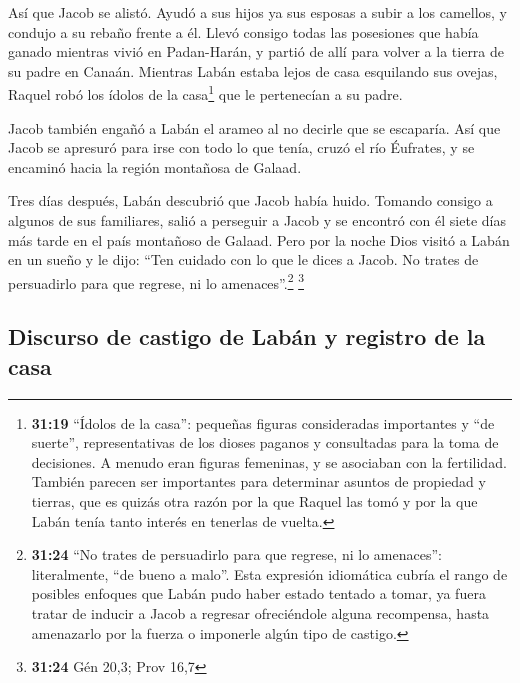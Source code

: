  Así que Jacob se alistó. Ayudó a sus hijos ya sus
esposas a subir a los camellos,  y condujo a su rebaño
frente a él. Llevó consigo todas las posesiones que había ganado
mientras vivió en Padan-Harán, y partió de allí para volver a la tierra
de su padre en Canaán.  Mientras Labán estaba lejos de
casa esquilando sus ovejas, Raquel robó los ídolos de la casa\footnote{\textbf{31:19}
  ``Ídolos de la casa'': pequeñas figuras consideradas importantes y
  ``de suerte'', representativas de los dioses paganos y consultadas
  para la toma de decisiones. A menudo eran figuras femeninas, y se
  asociaban con la fertilidad. También parecen ser importantes para
  determinar asuntos de propiedad y tierras, que es quizás otra razón
  por la que Raquel las tomó y por la que Labán tenía tanto interés en
  tenerlas de vuelta.} que le pertenecían a su padre.

 Jacob también engañó a Labán el arameo al no decirle que
se escaparía.  Así que Jacob se apresuró para irse con
todo lo que tenía, cruzó el río Éufrates, y se encaminó hacia la región
montañosa de Galaad.

 Tres días después, Labán descubrió que Jacob había
huido.  Tomando consigo a algunos de sus familiares,
salió a perseguir a Jacob y se encontró con él siete días más tarde en
el país montañoso de Galaad.  Pero por la noche Dios
visitó a Labán en un sueño y le dijo: ``Ten cuidado con lo que le dices
a Jacob. No trates de persuadirlo para que regrese, ni lo
amenaces''.\footnote{\textbf{31:24} ``No trates de persuadirlo para que
  regrese, ni lo amenaces'': literalmente, ``de bueno a malo''. Esta
  expresión idiomática cubría el rango de posibles enfoques que Labán
  pudo haber estado tentado a tomar, ya fuera tratar de inducir a Jacob
  a regresar ofreciéndole alguna recompensa, hasta amenazarlo por la
  fuerza o imponerle algún tipo de castigo.} \footnote{\textbf{31:24}
  Gén 20,3; Prov 16,7}

\hypertarget{discurso-de-castigo-de-labuxe1n-y-registro-de-la-casa}{%
\subsection{Discurso de castigo de Labán y registro de la
casa}\label{discurso-de-castigo-de-labuxe1n-y-registro-de-la-casa}}

